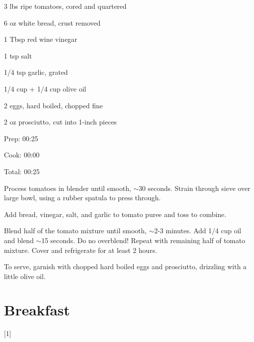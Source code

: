 \documentclass[oneside]{book}  %
\def\thisrecipe{}  %
\newcommand{\chapterrec}[1]{  %
  \newpage \def\thisrecipe{} \chapter{#1} \vspace{1.1em}
}
\newcommand{\chaptertoc}[1]{  %
  \chapterrec{#1} \vspace{-1.1em}  %
  \startcontents[chapters] \printcontents[chapters]{chapter_toc_}{1}[1]{}
}
\newcommand{\about}{$\sim$}
\begin{document}
\begin{IT}
  \begin{ingredients}
    \item[3 lbs] ripe tomatoes, cored and quartered
    \item[6 oz] white bread, crust removed
    \item[1 Tbsp] red wine vinegar
    \item[1 tsp] salt
    \item[1/4 tsp] garlic, grated
    \item[1/4 cup + 1/4 cup] olive oil
    \item[2] eggs, hard boiled, chopped fine
    \item[2 oz] prosciutto, cut into 1-inch pieces
  \end{ingredients}

  \switchcolumn

  \begin{timeline}
    \item[Prep:]  00:25
    \item[Cook:]  00:00
    \item[Total:] 00:25
  \end{timeline}
\end{IT}

\begin{directions}
  \item Process tomatoes in blender until smooth, \about 30 seconds. Strain
  through sieve over large bowl, using a rubber spatula to press through.

  \item Add bread, vinegar, salt, and garlic to tomato puree and toss to
  combine.

  \item Blend half of the tomato mixture until smooth, \about 2-3 minutes. Add
  1/4 cup oil and blend \about 15 seconds. Do no overblend! Repeat with
  remaining half of tomato mixture. Cover and refrigerate for at least 2 hours.

  \item To serve, garnish with chopped hard boiled eggs and prosciutto,
  drizzling with a little olive oil.
\end{directions}

\chaptertoc{Breakfast} \label{chap:breakfast}
\end{document}
